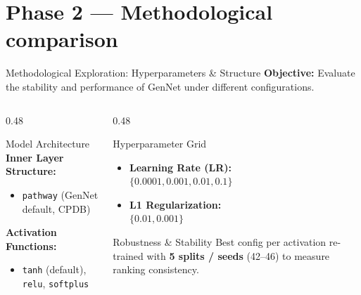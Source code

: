 \documentclass[aspectratio=169]{beamer}
\begin{document}
\section{Phase 2 — Methodological comparison}

\begin{frame}{Methodological Exploration: Hyperparameters \& Structure}
    \textbf{Objective:} Evaluate the stability and performance of GenNet under different configurations.

    \vspace{0.4cm}

    \begin{columns}[T, onlytextwidth]
        \begin{column}{0.48\textwidth}
            \begin{block}{Model Architecture}
                \small
                \textbf{Inner Layer Structure:}
                \begin{itemize}
                    \item \texttt{pathway} (GenNet default, CPDB)
                \end{itemize}

                \vspace{0.2cm}

                \textbf{Activation Functions:}
                \begin{itemize}
                    \item \texttt{tanh} (default), \texttt{relu}, \texttt{softplus}
                \end{itemize}
            \end{block}
        \end{column}

        \begin{column}{0.48\textwidth}
            \pause
            \begin{block}{Hyperparameter Grid}
                \small
                \begin{itemize}
                    \item \textbf{Learning Rate (LR):} \\ $\{0.0001, 0.001, 0.01, 0.1\}$
                    \item \textbf{L1 Regularization:} \\ $\{0.01, 0.001\}$
                \end{itemize}
            \end{block}
            \pause
            \begin{block}{Robustness \& Stability}
                \small
                Best config per activation re-trained with \textbf{5 splits / seeds} (42--46) to measure ranking consistency.
            \end{block}
        \end{column}
    \end{columns}


\end{frame}
\end{document}
